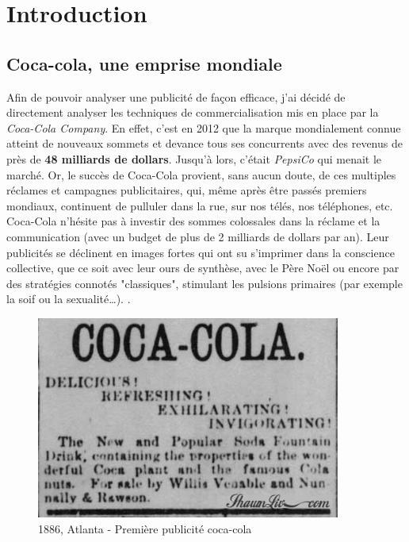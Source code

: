 \chapter{Introduction}

\label{Introduction}

\section{Coca-cola, une emprise mondiale}

Afin de pouvoir analyser une publicité de façon efficace, j'ai décidé de directement analyser les techniques de commercialisation mis en place par la \textit{Coca-Cola Company}.
En effet, c'est en 2012 que la marque mondialement connue atteint de nouveaux sommets et devance tous ses concurrents avec des revenus de près de \textbf{48 milliards de dollars}.  Jusqu'à lors, c'était \textit{PepsiCo} qui menait le marché.
Or, le succès de Coca-Cola provient, sans aucun doute, de ces multiples réclames et campagnes publicitaires, qui, même après être passés premiers mondiaux, continuent de pulluler dans la rue, sur nos télés, nos téléphones, etc.\\
Coca-Cola n'hésite pas à investir des sommes colossales dans la réclame et la communication (avec un budget de plus de 2 milliards de dollars par an). Leur publicités se déclinent en images fortes qui ont su s'imprimer dans la conscience collective, que ce soit avec leur ours de synthèse, avec le Père Noël ou encore par des stratégies connotés "classiques", stimulant les pulsions primaires (par exemple la soif ou la sexualité…). \parencite{Ref1}. \\


\hfill \break

\begin{figure}[th]
\centering
\includegraphics[width=100mm]{medias/1ere_pub}
\decoRule
\caption{1886, Atlanta - Première publicité coca-cola}
\end{figure}
\newpage

